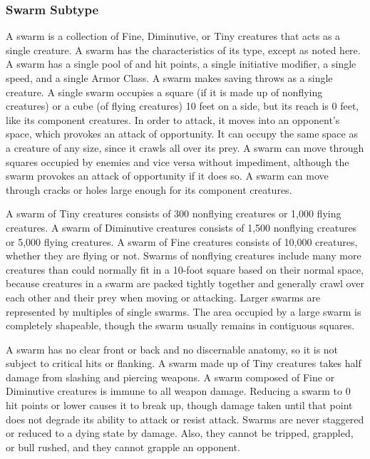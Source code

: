 {\subsubsection{Swarm Subtype} A swarm is a collection of Fine, Diminutive, or Tiny creatures that acts as a single creature. A swarm has the characteristics of its type, except as noted here. A swarm has a single pool of  and hit points, a single initiative modifier, a single speed, and a single Armor Class. A swarm makes saving throws as a single creature. A single swarm occupies a square (if it is made up of nonflying creatures) or a cube (of flying creatures) 10 feet on a side, but its reach is 0 feet, like its component creatures. In order to attack, it moves into an opponent's space, which provokes an attack of opportunity. It can occupy the same space as a creature of any size, since it crawls all over its prey. A swarm can move through squares occupied by enemies and vice versa without impediment, although the swarm provokes an attack of opportunity if it does so. A swarm can move through cracks or holes large enough for its component creatures.

A swarm of Tiny creatures consists of 300 nonflying creatures or 1,000 flying creatures. A swarm of Diminutive creatures consists of 1,500 nonflying creatures or 5,000 flying creatures. A swarm of Fine creatures consists of 10,000 creatures, whether they are flying or not. Swarms of nonflying creatures include many more creatures than could normally fit in a 10-foot square based on their normal space, because creatures in a swarm are packed tightly together and generally crawl over each other and their prey when moving or attacking. Larger swarms are represented by multiples of single swarms. The area occupied by a large swarm is completely shapeable, though the swarm usually remains in contiguous squares.

 A swarm has no clear front or back and no discernable anatomy, so it is not subject to critical hits or flanking. A swarm made up of Tiny creatures takes half damage from slashing and piercing weapons. A swarm composed of Fine or Diminutive creatures is immune to all weapon damage. Reducing a swarm to 0 hit points or lower causes it to break up, though damage taken until that point does not degrade its ability to attack or resist attack. Swarms are never staggered or reduced to a dying state by damage. Also, they cannot be tripped, grappled, or bull rushed, and they cannot grapple an opponent.

}
